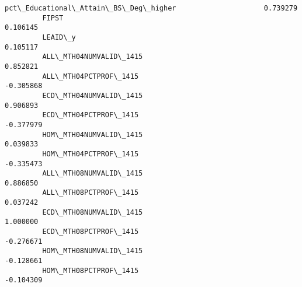 \documentclass[11pt]{article}
\begin{document}
\begin{Verbatim}[commandchars=\\\{\}]
         pct\_Educational\_Attain\_BS\_Deg\_higher                     0.739279   
         FIPST                                                    0.106145   
         LEAID\_y                                                  0.105117   
         ALL\_MTH04NUMVALID\_1415                                   0.852821   
         ALL\_MTH04PCTPROF\_1415                                   -0.305868   
         ECD\_MTH04NUMVALID\_1415                                   0.906893   
         ECD\_MTH04PCTPROF\_1415                                   -0.377979   
         HOM\_MTH04NUMVALID\_1415                                   0.039833   
         HOM\_MTH04PCTPROF\_1415                                   -0.335473   
         ALL\_MTH08NUMVALID\_1415                                   0.886850   
         ALL\_MTH08PCTPROF\_1415                                    0.037242   
         ECD\_MTH08NUMVALID\_1415                                   1.000000   
         ECD\_MTH08PCTPROF\_1415                                   -0.276671   
         HOM\_MTH08NUMVALID\_1415                                  -0.128661   
         HOM\_MTH08PCTPROF\_1415                                   -0.104309   
         

\end{Verbatim}
\end{document}
